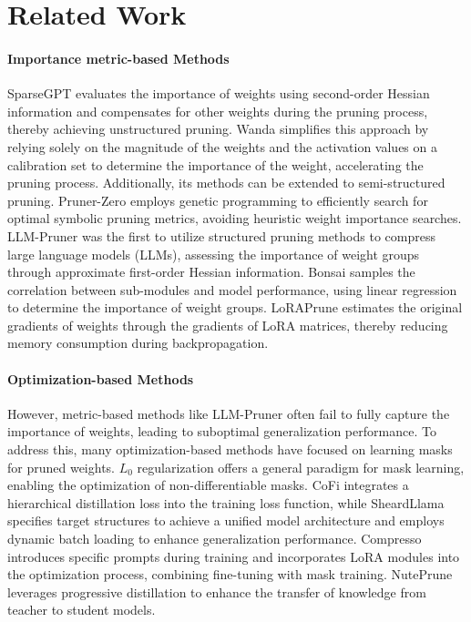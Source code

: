 \section{Related Work}
\paragraph{Importance metric-based Methods}SparseGPT \cite{frantar2023sparsegpt} evaluates the importance of weights using second-order Hessian information and compensates for other weights during the pruning process, thereby achieving unstructured pruning. Wanda \cite{sun2023wanda} simplifies this approach by relying solely on the magnitude of the weights and the activation values on a calibration set to determine the importance of the weight, accelerating the pruning process. Additionally, its methods can be extended to semi-structured pruning. Pruner-Zero \cite{dong2024pruner} employs genetic programming to efficiently search for optimal symbolic pruning metrics, avoiding heuristic weight importance searches. LLM-Pruner \cite{ma2023llm} was the first to utilize structured pruning methods to compress large language models (LLMs), assessing the importance of weight groups through approximate first-order Hessian information. Bonsai \cite{dery2024everybody} samples the correlation between sub-modules and model performance, using linear regression to determine the importance of weight groups. LoRAPrune \cite{zhang2023loraprune} estimates the original gradients of weights through the gradients of LoRA matrices, thereby reducing memory consumption during backpropagation.

\paragraph{Optimization-based Methods}However, metric-based methods like LLM-Pruner \cite{ma2023llm} often fail to fully capture the importance of weights, leading to suboptimal generalization performance. To address this, many optimization-based methods have focused on learning masks for pruned weights. $L_0$ regularization \cite{louizos2018learning} offers a general paradigm for mask learning, enabling the optimization of non-differentiable masks. CoFi \cite{xia2022structured} integrates a hierarchical distillation loss into the training loss function, while SheardLlama \cite{xia2023sheared} specifies target structures to achieve a unified model architecture and employs dynamic batch loading to enhance generalization performance. Compresso \cite{guo2023compresso} introduces specific prompts during training and incorporates LoRA modules into the optimization process, combining fine-tuning with mask training. NutePrune \cite{li2024nuteprune} leverages progressive distillation to enhance the transfer of knowledge from teacher to student models.